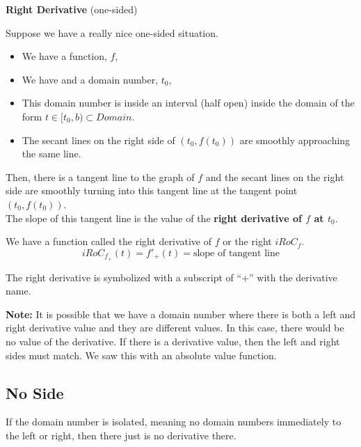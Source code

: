 \documentclass{ximera}
\begin{document}
\begin{definition} \textbf{\textcolor{green!50!black}{Right Derivative}}  (one-sided) 


Suppose we have a really nice one-sided situation.


\begin{itemize}
\item We have a function, $f$, 
\item We have and a domain number, $t_0$, 
\item This domain number is inside an interval (half open) inside the domain of the form  $t \in [t_0, b) \subset Domain$. 
\item The secant lines on the right side of $(t_0, f(t_0))$ are smoothly approaching the same line.
\end{itemize}

Then, there is a tangent line to the graph of $f$ and the secant lines on the right side are smoothly turning into this tangent line at the tangent point $(t_0, f(t_0))$. \\

The slope of this tangent line is the value of the \textbf{right derivative of $f$ at $t_0$}.


We have a function called the right derivative of $f$ or the right $iRoC_f$. \\

\[
iRoC_{f_{+}}(t) =f'_{+}(t) = \text{slope of tangent line}
\]


The right derivative is symbolized with a subscript of ``+'' with the derivative name. \\ 

\end{definition}



\textbf{Note:} It is possible that we have a domain number where there is both a left and right derivative value and they are different values.  In this case, there would be no value of the derivative.  If there is a derivative value, then the left and right sides must match.  We saw this with an absolute value function.





\subsection*{No Side}


If the domain number is isolated, meaning no domain numbers immediately to the left or right, then there just is no derivative there. \\
\end{document}
